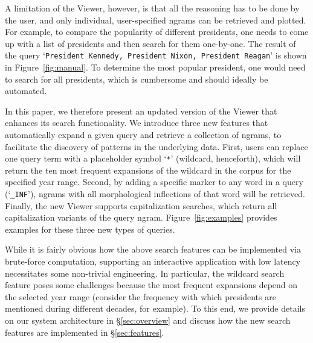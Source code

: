 \documentclass[11pt,a4paper]{article}
\newcommand{\query}[1]{\texttt{#1}}
\begin{document}
A limitation of the Viewer, however, is that all the reasoning has to be done by the user, and only individual, user-specified ngrams can be retrieved and plotted. For example, to compare the popularity of different presidents, one needs to come up with a list of presidents and then search for them one-by-one. The result of the query `\query{President Kennedy, President Nixon, President Reagan}' is shown in Figure~\ref{fig:manual}. To determine the most popular president, one would need to search for all presidents, which is cumbersome and should ideally be automated.



In this paper, we therefore present an updated version of the Viewer that enhances its search functionality. We introduce three new features that automatically expand a given query and retrieve a collection of ngrams, to facilitate the discovery of patterns in the underlying data. First, users can replace one query term with a placeholder symbol `\query{*}' (wildcard, henceforth), which will return the ten most frequent expansions of the wildcard in the corpus for the specified year range. 
Second, by adding a specific marker to any word in a query (`\query{\_INF}'), ngrams with all morphological inflections of that word will be retrieved. 
Finally, the new Viewer supports capitalization searches, which return all capitalization variants of the query ngram. Figure~\ref{fig:examples} provides examples for these three new types of queries.

While it is fairly obvious how the above search features can be implemented via brute-force computation, supporting an interactive application with low latency necessitates some non-trivial engineering. In particular, the wildcard search feature poses some challenges because the most frequent expansions depend on the selected year range (consider the frequency with which presidents are mentioned during different decades, for example). To this end, we provide details on our system architecture in \S\ref{sec:overview}  and discuss how the new search features are implemented in \S\ref{sec:features}.
\end{document}
